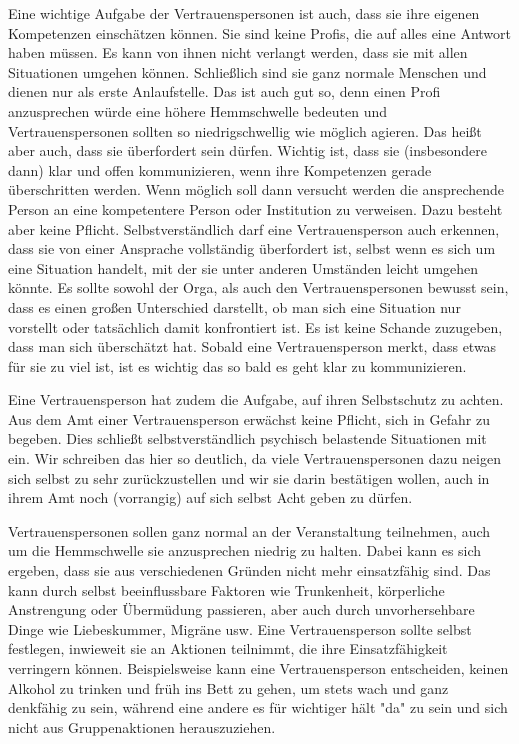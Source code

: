 \documentclass[DIV=calc]{scrartcl}
\begin{document}
Eine wichtige Aufgabe der Vertrauenspersonen ist auch, dass sie ihre eigenen Kompetenzen einschätzen können. Sie sind keine Profis, die auf alles eine Antwort haben müssen. Es kann von ihnen nicht verlangt werden, dass sie mit allen Situationen umgehen können. Schließlich sind sie ganz normale Menschen und dienen nur als erste Anlaufstelle. Das ist auch gut so, denn einen Profi anzusprechen würde eine höhere Hemmschwelle bedeuten und Vertrauenspersonen sollten so niedrigschwellig wie möglich agieren. Das heißt aber auch, dass sie überfordert sein dürfen. Wichtig ist, dass sie (insbesondere dann) klar und offen kommunizieren, wenn ihre Kompetenzen gerade überschritten werden. Wenn möglich soll dann versucht werden die ansprechende Person an eine kompetentere Person oder Institution zu verweisen. Dazu besteht aber keine Pflicht. Selbstverständlich darf eine Vertrauensperson auch erkennen, dass sie von einer Ansprache vollständig überfordert ist, selbst wenn es sich um eine Situation handelt, mit der sie unter anderen Umständen leicht umgehen könnte. Es sollte sowohl der Orga, als auch den Vertrauenspersonen bewusst sein, dass es einen großen Unterschied darstellt, ob man sich eine Situation nur vorstellt oder tatsächlich damit konfrontiert ist. Es ist keine Schande zuzugeben, dass man sich überschätzt hat.
Sobald eine Vertrauensperson merkt, dass etwas für sie zu viel ist, ist es wichtig das so bald es geht klar zu kommunizieren.

Eine Vertrauensperson hat zudem die Aufgabe, auf ihren Selbstschutz zu achten. Aus dem Amt einer Vertrauensperson erwächst keine Pflicht, sich in Gefahr zu begeben. Dies schließt selbstverständlich psychisch belastende Situationen mit ein. Wir schreiben das hier so deutlich, da viele Vertrauenspersonen dazu neigen sich selbst zu sehr zurückzustellen und wir sie darin bestätigen wollen, auch in ihrem Amt noch (vorrangig) auf sich selbst Acht geben zu dürfen. 

Vertrauenspersonen sollen ganz normal an der Veranstaltung teilnehmen, auch um die Hemmschwelle sie anzusprechen niedrig zu halten. Dabei kann es sich ergeben, dass sie aus verschiedenen Gründen nicht mehr einsatzfähig sind. Das kann durch selbst beeinflussbare Faktoren wie Trunkenheit, körperliche Anstrengung oder Übermüdung passieren, aber auch durch unvorhersehbare Dinge wie Liebeskummer, Migräne usw. Eine Vertrauensperson sollte selbst festlegen, inwieweit sie an Aktionen teilnimmt, die ihre Einsatzfähigkeit verringern können. Beispielsweise kann eine Vertrauensperson entscheiden, keinen Alkohol zu trinken und früh ins Bett zu gehen, um stets wach und ganz denkfähig zu sein, während eine andere es für wichtiger hält "da" zu sein und sich nicht aus Gruppenaktionen herauszuziehen.
\end{document}
